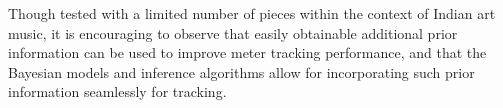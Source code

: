 Though tested with a limited number of pieces within the context of Indian art music, it is encouraging to observe that easily obtainable additional prior information can be used to improve meter tracking performance, and that the Bayesian models and inference algorithms allow for incorporating such prior information seamlessly for tracking.
% 
% 
